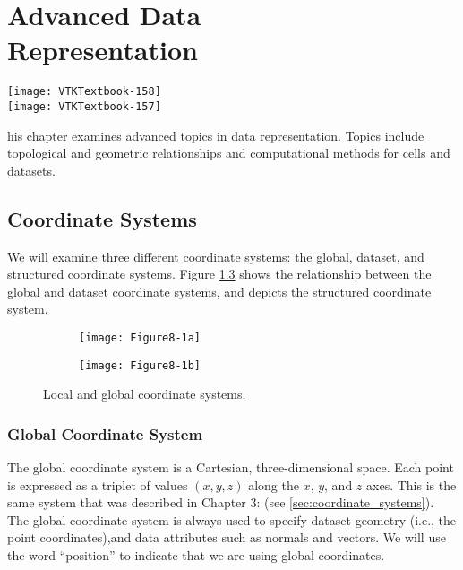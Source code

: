\chapter[Advanced Data Representation]{Advanced Data\\ Representation}
\label{chap:advanced_data_representation}

\vspace{-9\baselineskip} %
\hfill
 \begin{minipage}{0.5\textwidth}
 \centering
 \texttt{[image: VTKTextbook-158]}\\
 \texttt{[image: VTKTextbook-157]}
 \end{minipage}
\vspace{2\baselineskip}

his chapter examines advanced topics in data representation.
Topics include topological and geometric relationships and computational methods for cells and datasets.

\section{Coordinate Systems}
We will examine three different coordinate systems: the global, dataset, and structured coordinate systems.
Figure \ref{fig:Figure8-1} shows the relationship between the global and dataset coordinate systems, and depicts the structured coordinate system.

\begin{figure}[!htb]
    \centering
    \begin{subfigure}{0.48\linewidth}
        \centering
        \texttt{[image: Figure8-1a]}
        \caption*{}\label{fig:Figure8-1a}
    \end{subfigure}
    \hfill
    \begin{subfigure}{0.48\linewidth}
        \centering
        \texttt{[image: Figure8-1b]}
        \caption*{}\label{fig:Figure8-1b}
    \end{subfigure}%
    \caption{Local and global coordinate systems.}
    \label{fig:Figure8-1}
\end{figure}


\subsection{Global Coordinate System}
The global coordinate system is a Cartesian, three-dimensional space. Each point is expressed as a triplet of values $(x,y,z)$ along the $x$, $y$, and $z$ axes.
This is the same system that was described in Chapter 3:  (see \ref{sec:coordinate_systems}).
The global coordinate system is always used to specify dataset geometry (i.e., the point coordinates),and data attributes such as normals and vectors.
We will use the word ``position'' to indicate that we are using global coordinates.

